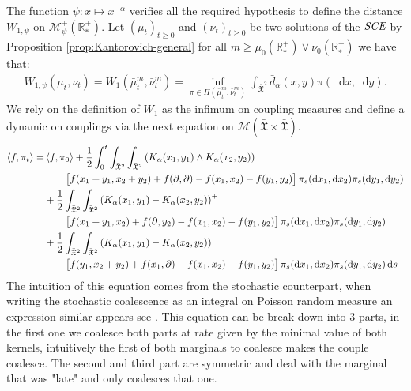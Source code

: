\documentclass[11pt,a4paper]{article}
\newcommand{\RRP}{\mathbb{R}^+_*}
\newcommand{\MC}{\mathcal{M}}
\newcommand{\XF}{\mathfrak{X}}
\newcommand{\SCE}{\emph{SCE}}
\newcommand{\Proc}[1]{\left(#1\right)_{t\geq 0}}
\newcommand{\brac}[1]{\left\langle#1\right\rangle}
\newcommand{\dd}{\mathop{}\!\mathrm{d}}
\begin{document}
The function $\psi : x \mapsto x^{-\alpha}$ verifies all the required hypothesis to define the distance $W_{1,\psi}$ on $\MC^+_{\psi}(\RRP)$. Let $\Proc{\mu_t}$ and $\Proc{\nu_t}$ be two solutions of the $\SCE$ by Proposition \ref{prop:Kantorovich-general} for all $m \geq \mu_0(\RRP) \vee \nu_0(\RRP)$ we have that:
\begin{align*}
    W_{1,\psi}(\mu_t,\nu_t) = W_1\left(\bar{\mu}^m_t,\bar{\nu}^m_t \right) = \inf_{\pi \in \Pi(\bar{\mu}^m_t,\bar{\nu}^m_t)} \int_{\bar{\XF}^2} \bar{d}_\alpha(x,y) \pi(\dd x, \dd y).
\end{align*}
We rely on the definition of $W_1$ as the infimum on coupling measures and define a dynamic on couplings via the next equation on $\MC(\bar{\XF}\times \bar{\XF})$.
\begin{align*}
\brac{f,\pi_t} =& \brac{f,\pi_0} + \dfrac12\int_0^t \int_{\bar{\XF}^2} \int_{\bar{\XF}^2}\left(K_\alpha(x_1,y_1)\wedge K_\alpha(x_2,y_2) \right) \\
    &\qquad  \left[f(x_1+y_1,x_2+y_2) + f(\partial,\partial)- f(x_1,x_2) -f(y_1,y_2) \vphantom{A^2} \right]\pi_s(\dd x_1,\dd x_2)\pi_s(\dd y_1,\dd y_2)\\
    &+ \dfrac12\int_{\bar{\XF}^2}\int_{\bar{\XF}^2} \left(K_\alpha(x_1,y_1)- K_\alpha(x_2,y_2) \right)^+ \\
    &\qquad\left[f(x_1+y_1,x_2) + f(\partial,y_2)- f(x_1,x_2) -f(y_1,y_2) \vphantom{A^2} \right]\pi_s(\dd x_1,\dd x_2)\pi_s(\dd y_1,\dd y_2)\\
    &+ \dfrac12\int_{\bar{\XF}^2}\int_{\bar{\XF}^2} \left(K_\alpha(x_1,y_1)- K_\alpha(x_2,y_2) \right)^-\\
    &\qquad\left[f(y_1,x_2 + y_2) + f(x_1,\partial)- f(x_1,x_2) -f(y_1,y_2) \vphantom{A^2} \right]\pi_s(\dd x_1,\dd x_2)\pi_s(\dd y_1,\dd y_2) \dd s
\end{align*}
The intuition of this equation comes from the stochastic counterpart, when writing the stochastic coalescence as an  integral on Poisson random measure an expression similar appears see \cite{fournier2004convergence}. This equation can be break down into $3$ parts, in the first one we coalesce both parts at rate given by the minimal value of both kernels, intuitively the first of both marginals to coalesce makes the couple coalesce. The second and third part are symmetric and deal with the marginal that was "late" and only coalesces that one.
\end{document}
